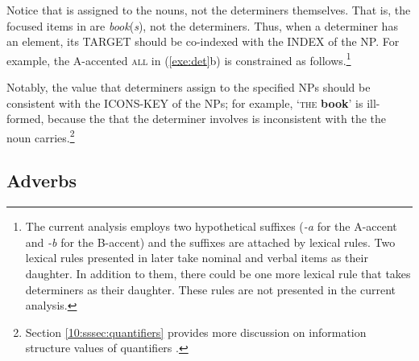 
\noindent Notice that  is assigned to the nouns, not the
determiners themselves. That is, the focused items in 
are \textit{book}(\textit{s}), not the determiners.  Thus, when a
determiner has an  element, its TARGET should be co-indexed
with the INDEX of the NP.  For example, the
A-accented \textsc{all} in (\ref{exe:det}b) is constrained as
follows.\footnote{The current analysis employs two hypothetical
  suffixes (\textit{-a} for the A-accent and \textit{-b} for the B-accent) and the
  suffixes are attached by lexical rules. Two lexical rules presented
  in  later take nominal and verbal items as
  their daughter. In addition to them, there could be one
  more lexical rule that takes determiners as their daughter. These
  rules are not presented in the current analysis.}



\noindent Notably, the  value that determiners assign to
the specified NPs should be consistent with the ICONS-KEY of the
NPs; for example, `\textsc{the} \textbf{book}' is
ill-formed, because the  that the determiner
involves is inconsistent with the  the noun
carries.\footnote{Section \ref{10:sssec:quantifiers} provides more discussion
  on information structure values of
  quantifiers .}




\subsection{Adverbs}
\label{10:ssec:adverbs}


